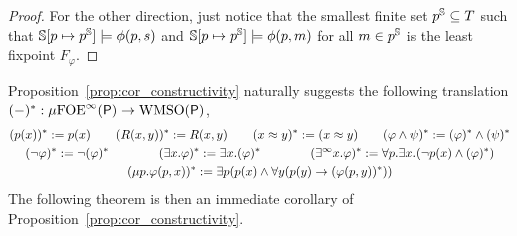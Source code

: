 \begin{proof}
For the other direction, just notice that the smallest finite set $p^{\mathbb{S}} \subseteq T$ such that $\mathbb{S}[p\mapsto p^{\mathbb{S}}] \models \phi(p,s)$ and $\mathbb{S}[p\mapsto p^{\mathbb{S}}] \models \phi(p,m)$ for all $m \in p^{\mathbb{S}}$ is the least fixpoint $F_\varphi$. %
 \end{proof}

\noindent Proposition~\ref{prop:cor_constructivity} naturally suggests the following translation $(-)^*:\mu{\ensuremath{\mathrm{FOE}}}^\infty(\mathsf{P})\to\mathrm{WMSO}(\mathsf{P})$,
\begin{gather*}
(p(x))^* \mathrel{: =} p(x) \qquad
(R(x,y))^* \mathrel{: =} R(x,y) \qquad
(x\approx y)^* \mathrel{: =}  (x \approx y) \qquad
(\varphi \land \psi)^* \mathrel{: =} (\varphi)^* \land (\psi)^* \\
(\lnot \varphi)^* \mathrel{: =}  \lnot (\varphi)^* \qquad\qquad
(\exists x. \varphi)^* \mathrel{: =}  \exists x. (\varphi)^* \qquad\qquad
(\exists^\infty x. \varphi)^* \mathrel{: =}  \forall p.\exists x. (\lnot p(x) \land (\varphi)^*) \\
(\mu p. \varphi(p,x))^* \mathrel{: =}  \exists p ( p(x) \land \forall y ( p(y) \to (\varphi(p,y) )^*))
\end{gather*}
%
The following theorem %
is then an immediate corollary of Proposition~\ref{prop:cor_constructivity}.

